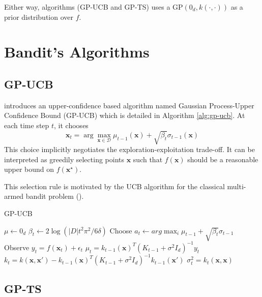\documentclass{article} %
\begin{document}
Either way, algorithms (GP-UCB and GP-TS) uses a GP$(0_d, k(\cdot,\cdot))$ as a prior distribution over $f$.


\section{Bandit's Algorithms}

\subsection{GP-UCB}
\citet{DBLP:conf/icml/SrinivasKKS10} introduces an upper-confidence based algorithm named Gaussian Process-Upper Confidence Bound (GP-UCB) which is detailed in Algorithm \ref{alg:gp-ucb}.
At each time step $t$, it chooses
$$\mathbf{x}_t = \arg\max_{\mathbf{x} \in \mathcal{D}} \mu_{t-1}(\mathbf{x}) + \sqrt{\beta_t} \sigma_{t-1}(\mathbf{x})$$
This choice implicitly negotiates the exploration-exploitation trade-off.
It can be interpreted as greedily selecting points $\mathbf{x}$ such that $f(\mathbf{x})$ should be a reasonable upper bound on $f(\mathbf{x}^\star)$.

This selection rule is motivated by the UCB algorithm for the classical multi-armed bandit problem (\citet{Auer:2003:UCB:944919.944941, Kocsis:2006:BBM:2091602.2091633}).

\begin{algorithm}  
  \caption{GP-UCB
    \label{alg:gp-ucb}}  
  \begin{algorithmic}[1]  
    \State  $\mu \gets 0_d$
          \State  $\beta_t \gets 2 \log (\left| D \right| t^2 \pi^2 / 6 \delta)$
    \State Choose $a_t \gets arg \max_i \mu_{t-1} + \sqrt{\beta_t} \sigma_{t-1}$
    \State Observe $y_t = f(\mathbf{x}_t) + \epsilon_t$
    \State $\mu_t = k_{t-1}(\mathbf{x})^T {(K_{t-1} + \sigma^2 I_d)}^{-1} y_t$
    \State $k_t = k(\mathbf{x}, \mathbf{x}') - k_{t-1}(\mathbf{x})^T {(K_{t-1} + \sigma^2 I_d)}^{-1} k_{t-1}(\mathbf{x'}) $
    \State $\sigma_{t}^2 = k_t(\mathbf{x},\mathbf{x})$
      \EndFor  
  \end{algorithmic}  
\end{algorithm}

\subsection{GP-TS}
\end{document}
